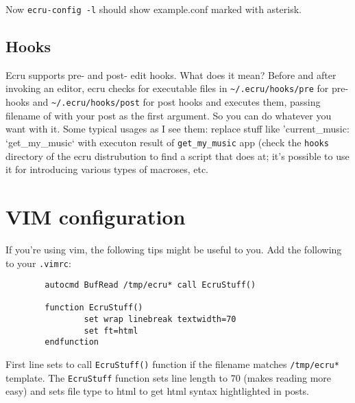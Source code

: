 \documentclass{article}
\begin{document}
	Now {\tt ecru-config -l} should show example.conf marked with asterisk.
      \subsection{Hooks}
        Ecru supports pre- and post- edit hooks. What does it mean? Before and after invoking an editor,
	ecru checks for executable files in {\tt \verb+~+/.ecru/hooks/pre} for pre- hooks and
	{\tt \verb+~+/.ecru/hooks/post} for post hooks and executes them, passing filename of with your
	post as the first argument. So you can do whatever you want with it. Some typical usages as
	I see them: replace stuff like 'current_music: `get_my_music` with executon result of 
	{\tt get_my_music} app (check the {\tt hooks} directory of the ecru distrubution to find
	a script that does at; it's possible to use it for introducing various types of macroses, etc.
     \section{VIM configuration}
        If you're using vim, the following tips might be useful to you. Add the following to your {\tt .vimrc}:
        \begin{verbatim}
		autocmd BufRead /tmp/ecru* call EcruStuff()

		function EcruStuff()
		        set wrap linebreak textwidth=70
		        set ft=html
		endfunction
	\end{verbatim}

	First line sets to call {\tt EcruStuff()} function if the filename matches {\tt /tmp/ecru*} template.
	The {\tt EcruStuff} function sets line length to 70 (makes reading more easy) and sets file type to
	html to get html syntax hightlighted in posts.
\end{document}
